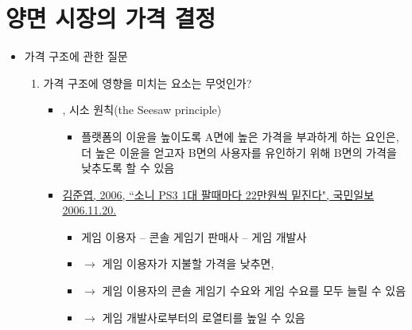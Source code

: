 \pagebreak

\section{양면 시장의 가격 결정}
\begin{itemize}
\item 가격 구조에 관한 질문
	\begin{enumerate}
	\item 가격 구조에 영향을 미치는 요소는 무엇인가? 
		\begin{itemize}
		\item \cite{Rochet:2006jl}, 시소 원칙(the Seesaw principle)
			\begin{itemize}
			\item 플랫폼의 이윤을 높이도록 A면에 높은 가격을 부과하게 하는 요인은, 더 높은 이윤을 얻고자 B면의 사용자를 유인하기 위해 B면의 가격을 낮추도록 할 수 있음
			\end{itemize}
		\item \href{https://news.naver.com/main/read.nhn?mode=LSD&mid=sec&sid1=105&oid=143&aid=0000044770}{김준엽, 2006, ``소니 PS3 1대 팔때마다 22만원씩 밑진다", 국민일보 2006.11.20.}	
			\begin{itemize}
			\item 게임 이용자 -- 콘솔 게임기 판매사 -- 게임 개발사
			\item  $\rightarrow$ 게임 이용자가 지불할 가격을 낮추면, 
			\item $\rightarrow$ 게임 이용자의 콘솔 게임기 수요와 게임 수요를 모두 늘릴 수 있음
			\item $\rightarrow$ 게임 개발사로부터의 로열티를 높일 수 있음
			\end{itemize}


\end{itemize}
\end{enumerate}
\end{itemize}
